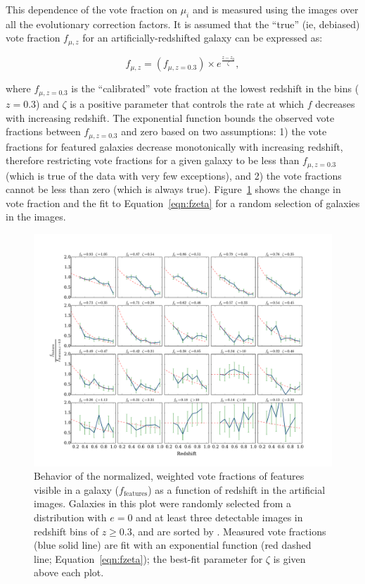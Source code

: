 \documentclass[twocolumn]{aastex6}
\begin{document}
This dependence of the vote fraction on $\mu_i$ and \zsim{} is measured using the
\ferengi{} images over all the evolutionary correction factors. It is assumed
that the ``true'' (ie, debiased) vote fraction $f_{\mu,z}$ for an
artificially-redshifted galaxy can be expressed as:

\begin{equation}
f_{\mu,z} = \left(f_{\mu,z=0.3}\right) \times e^{{\frac{z-z_0}{\zeta}}},
\label{eqn:fzeta}
\end{equation}

\noindent where $f_{\mu,z=0.3}$ is the ``calibrated'' vote fraction at the
lowest redshift in the \ferengi{} bins ($z=0.3$) and $\zeta$ is a positive
parameter that controls the rate at which $f$ decreases with increasing
redshift. The exponential function bounds the observed vote fractions
between $f_{\mu,z=0.3}$ and zero based on two assumptions: 1) the vote fractions for featured galaxies decrease monotonically with increasing redshift, therefore restricting vote fractions for a given galaxy to be less than $f_{\mu,z=0.3}$  (which is true of the data with very few exceptions), and 2) the vote fractions cannot be less than zero (which is always true). Figure~\ref{fig:zeta_examples} shows the
change in vote fraction and the fit to Equation~\ref{eqn:fzeta} for a random
selection of galaxies in the \ferengi{} images. 

\begin{figure}
\center
\includegraphics[width=\textwidth]{figures/zeta_examples_sorted.pdf}
\caption{Behavior of the normalized, weighted vote fractions of features
visible in a galaxy ($f_\textrm{features}$) as a function of redshift in the
artificial \ferengi{} images. Galaxies in this plot were randomly selected from
a distribution with $e=0$ and at least three detectable images in redshift bins
of $z\ge0.3$, and are sorted by \ffeaturesrest. Measured vote fractions (blue
solid line) are fit with an exponential function (red dashed line;
Equation~\ref{eqn:fzeta}); the best-fit parameter for $\zeta$ is given above
each plot.}
\label{fig:zeta_examples}
\end{figure}
\end{document}
